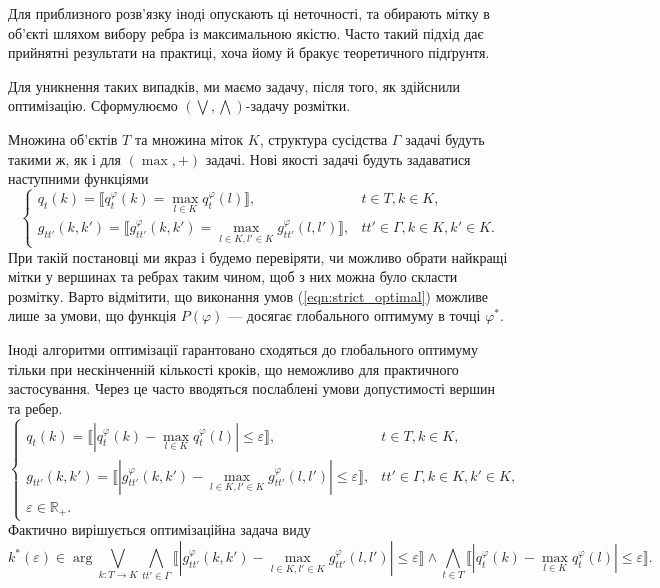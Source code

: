 Для приблизного розв'язку іноді опускають ці неточності, та обирають мітку в об'єкті 
шляхом вибору ребра із максимальною якістю. Часто такий підхід дає прийнятні результати 
на практиці, хоча йому й бракує теоретичного підґрунтя. 

Для уникнення таких випадків, ми маємо задачу, після того, як здійснили оптимізацію.
Сформулюємо $(\bigvee, \bigwedge)$-задачу розмітки.

Множина об'єктів $T$ та множина міток $K$, структура сусідства $\Gamma$ задачі будуть такими ж, як і для 
$(\max,+)$ задачі. Нові якості задачі будуть задаватися наступними функціями
\begin{equation*}
    \begin{cases}
    \label{eqn:strict_optimal}
    q_t(k) = \llbracket q^{\varphi}_t(k) = \max\limits_{l\in K}q^{\varphi}_t(l) \rrbracket, & t\in T, k\in K,\\
    g_{tt'}(k,k') = \llbracket g^\varphi_{tt'}(k,k')=\max\limits_{l\in K, l'\in K}g^{\varphi}_{tt'}(l,l')\rrbracket,
     & tt'\in\Gamma, k\in K, k'\in K.
\end{cases}
\end{equation*}
При такій постановці ми якраз і будемо перевіряти, чи можливо обрати найкращі
мітки у вершинах та ребрах таким чином, щоб з них можна було скласти розмітку.
Варто відмітити, що виконання умов (\ref{eqn:strict_optimal}) можливе лише за
умови, що функція $P(\varphi)$ --- досягає глобального оптимуму в точці $\varphi^*$.  

Іноді алгоритми оптимізації гарантовано сходяться до глобального оптимуму
тільки при нескінченній кількості кроків, що неможливо для практичного застосування.
Через це часто вводяться послаблені умови допустимості вершин та ребер.
\begin{equation*}
    \begin{cases}
    \label{eqn:epsilon_optimal}
    q_t(k) = \llbracket |q^{\varphi}_t(k) - \max\limits_{l\in K}q^{\varphi}_t(l)|\leq \varepsilon\rrbracket, & t\in T, k\in K,\\
    g_{tt'}(k,k') = \llbracket|g^\varphi_{tt'}(k,k')-\max\limits_{l\in K, l'\in K}g^{\varphi}_{tt'}(l,l')|\leq\varepsilon\rrbracket,
     & tt'\in\Gamma, k\in K, k'\in K,\\
    \varepsilon \in \mathbb{R_+}.
\end{cases}
\end{equation*}
Фактично вирішується оптимізаційна задача виду
\begin{equation*}
    k^*(\varepsilon)\in\arg\bigvee_{k:T\rightarrow K}\bigwedge_{tt'\in\Gamma}
    \llbracket|g^\varphi_{tt'}(k,k')-\max\limits_{l\in K, l'\in K}g^{\varphi}_{tt'}(l,l')|\leq\varepsilon\rrbracket\wedge
    \bigwedge_{t\in T}\llbracket|q^{\varphi}_t(k) - \max\limits_{l\in K}q^{\varphi}_t(l)|\leq \varepsilon\rrbracket.
\end{equation*}

